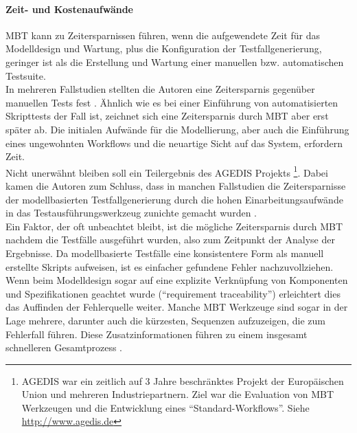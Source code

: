 \paragraph{Zeit- und Kostenaufwände} \Gls{MBT} kann zu Zeitersparnissen führen, wenn die aufgewendete Zeit für das Modelldesign und Wartung, plus die Konfiguration der Testfallgenerierung, geringer ist als die Erstellung und Wartung einer manuellen bzw. automatischen Testsuite.\\
In mehreren Fallstudien stellten die Autoren eine Zeitersparnis gegenüber manuellen Tests fest \cite{farchi_using_2002} \cite{prenninger_mbt_2005} \cite{pretschner_one_2005}. Ähnlich wie es bei einer Einführung von automatisierten Skripttests der Fall ist, zeichnet sich eine Zeitersparnis durch \Gls{MBT} aber erst später ab. Die initialen Aufwände für die Modellierung, aber auch die Einführung eines ungewohnten Workflows und die neuartige Sicht auf das System, erfordern Zeit.\\
Nicht unerwähnt bleiben soll ein Teilergebnis des AGEDIS Projekts \footnote{AGEDIS war ein zeitlich auf 3 Jahre beschränktes Projekt der Europäischen Union und mehreren Industriepartnern. Ziel war die Evaluation von \Gls{MBT} Werkzeugen und die Entwicklung eines ``Standard-Workflows''. Siehe \url{http://www.agedis.de}}. Dabei kamen die Autoren zum Schluss, dass in manchen Fallstudien die Zeitersparnisse der modellbasierten Testfallgenerierung durch die hohen Einarbeitungsaufwände in das Testausführungswerkzeug zunichte gemacht wurden \cite{craggs_agedis_2003}.\\
Ein Faktor, der oft unbeachtet bleibt, ist die mögliche Zeitersparnis durch \Gls{MBT} nachdem die Testfälle ausgeführt wurden, also zum Zeitpunkt der Analyse der Ergebnisse. Da modellbasierte Testfälle eine konsistentere Form als manuell erstellte Skripts aufweisen, ist es einfacher gefundene Fehler nachzuvollziehen. Wenn beim Modelldesign sogar auf eine explizite Verknüpfung von Komponenten und Spezifikationen geachtet wurde (``requirement traceability'') erleichtert dies das Auffinden der Fehlerquelle weiter. Manche \Gls{MBT} Werkzeuge sind sogar in der Lage mehrere, darunter auch die kürzesten, Sequenzen aufzuzeigen, die zum Fehlerfall führen. Diese Zusatzinformationen führen zu einem insgesamt schnelleren Gesamtprozess \cite{utting_practical_2007}.

